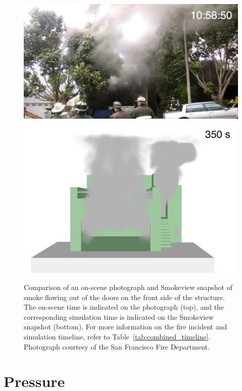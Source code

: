 \documentclass[12pt,oneside]{book}
\begin{document}
\begin{figure}[!ht]
\includegraphics[width=5.0in]{../Figures/Photo_Front_350_s}
\includegraphics[width=5.0in]{../Figures/SMV_Front_350_s}
\caption[Snapshot of smoke flowing out of the doors on the front side of the structure.]
{Comparison of an on-scene photograph and Smokeview snapshot of smoke flowing out of the doors on the front side of the structure. The on-scene time is indicated on the photograph (top), and the corresponding simulation time is indicated on the Smokeview snapshot (bottom). For more information on the fire incident and simulation timeline, refer to Table~\ref{tab:combined_timeline}. Photograph courtesy of the San Francisco Fire Department.}
\label{fig:timeline_comparison_front}
\end{figure}


\clearpage


\section{Pressure}
\label{sec:pressure}
\end{document}
